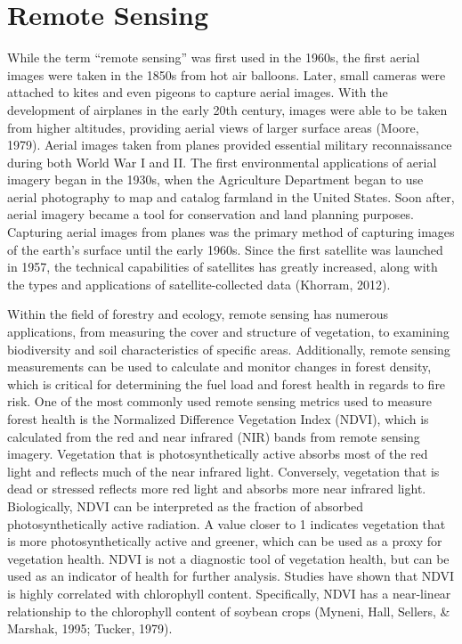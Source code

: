 \documentclass[12pt,twoside]{reedthesis}
\begin{document}
\hypertarget{remote-sensing}{%
\section{Remote Sensing}\label{remote-sensing}}

While the term ``remote sensing'' was first used in the 1960s, the first aerial images were taken in the 1850s from hot air balloons. Later, small cameras were attached to kites and even pigeons to capture aerial images. With the development of airplanes in the early 20th century, images were able to be taken from higher altitudes, providing aerial views of larger surface areas (Moore, 1979). Aerial images taken from planes provided essential military reconnaissance during both World War I and II. The first environmental applications of aerial imagery began in the 1930s, when the Agriculture Department began to use aerial photography to map and catalog farmland in the United States. Soon after, aerial imagery became a tool for conservation and land planning purposes. Capturing aerial images from planes was the primary method of capturing images of the earth's surface until the early 1960s. Since the first satellite was launched in 1957, the technical capabilities of satellites has greatly increased, along with the types and applications of satellite-collected data (Khorram, 2012).

Within the field of forestry and ecology, remote sensing has numerous applications, from measuring the cover and structure of vegetation, to examining biodiversity and soil characteristics of specific areas. Additionally, remote sensing measurements can be used to calculate and monitor changes in forest density, which is critical for determining the fuel load and forest health in regards to fire risk. One of the most commonly used remote sensing metrics used to measure forest health is the Normalized Difference Vegetation Index (NDVI), which is calculated from the red and near infrared (NIR) bands from remote sensing imagery. Vegetation that is photosynthetically active absorbs most of the red light and reflects much of the near infrared light. Conversely, vegetation that is dead or stressed reflects more red light and absorbs more near infrared light. Biologically, NDVI can be interpreted as the fraction of absorbed photosynthetically active radiation. A value closer to 1 indicates vegetation that is more photosynthetically active and greener, which can be used as a proxy for vegetation health. NDVI is not a diagnostic tool of vegetation health, but can be used as an indicator of health for further analysis. Studies have shown that NDVI is highly correlated with chlorophyll content. Specifically, NDVI has a near-linear relationship to the chlorophyll content of soybean crops (Myneni, Hall, Sellers, \& Marshak, 1995; Tucker, 1979).
\end{document}
